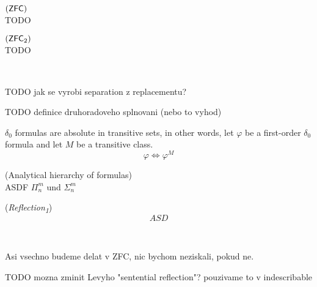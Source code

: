 \begin{definition}{$(\sf{ZFC})$}\label{def:zfc}\\
TODO
\end{definition}

\begin{definition}{$(\sf{ZFC\textsubscript{2}})$}\label{def:zfc_2}\\
TODO
\end{definition}

\

TODO jak se vyrobi separation z replacementu?

TODO definice druhoradoveho splnovani (nebo to vyhod)

\begin{lemma}\label{lemma:delta_0_absolute}
$\delta_0$ formulas are absolute in transitive sets, in other words, let $\varphi$ be a first-order $\delta_0$ formula and let $M$ be a transitive class.
\begin{equation}
\varphi \iff \varphi^M
\end{equation}
\end{lemma}

\begin{definition}{(Analytical hierarchy of formulas)}\\
\label{def:analytical_hierarchy}
ASDF 
$\Pi^m_n$ und $\Sigma^m_n$ 
\end{definition}


\begin{definition}{(\emph{Reflection\textsubscript{1}})}\label{def:reflection_1}\\
\begin{equation}
ASD
\end{equation}
\end{definition}

\



Asi vsechno budeme delat v ZFC, nic bychom neziskali, pokud ne.

TODO mozna zminit Levyho "sentential reflection"? pouzivame to v indescribable

\begin{comment}

Kanamori v reflexi rika, ze pro $\varphi$ a libovolny $\beta \in Ord$ existuje $\alpha$ ze $\varphi^{V_\alpha} \iff \varphi$ (s parametrama $x_1, \ldots, x_n \in V_\alpha$)


Prepsat modelovy veci do "kanamoriho notace" $<V_\kappa, \in, R>$ kde $R$ je nejaka relace\\
\prec !!
\end{comment}
